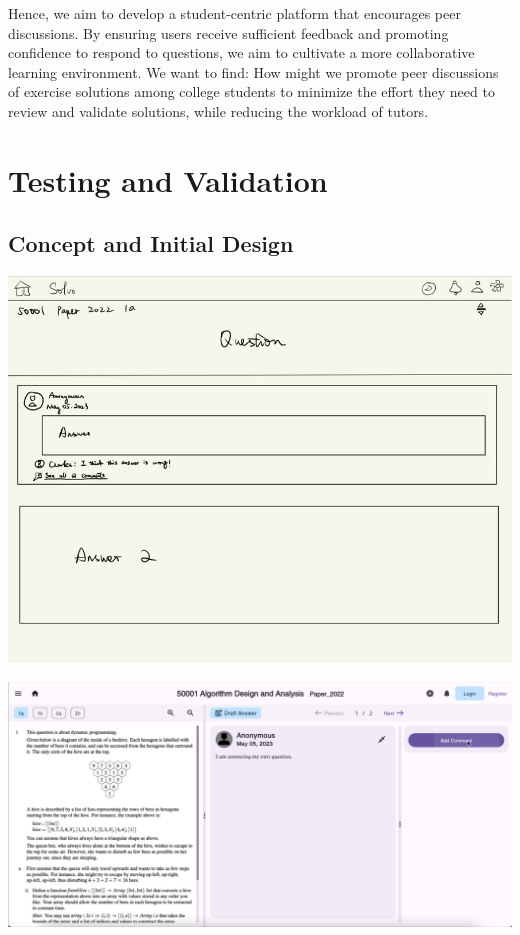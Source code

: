 \documentclass[a4paper]{article}
\begin{document}
    Hence, we aim to develop a student-centric platform that encourages peer discussions.
    By ensuring users receive sufficient feedback and promoting confidence to respond to questions, we aim to cultivate a more collaborative learning environment.
    We want to find: How might we promote peer discussions of exercise solutions among college students to minimize the effort they need to review and validate solutions,
    while reducing the workload of tutors.

    \section*{Testing and Validation}

    \subsection*{Concept and Initial Design}
    \noindent \begin{minipage}{0.4\textwidth}
                  \centering
                  \includegraphics[width=\textwidth]{concept2}
    \end{minipage}\hspace{0.05\textwidth}
    \begin{minipage}{0.57\textwidth}
        \centering
        \includegraphics[width=\textwidth]{question-page1}
    \end{minipage}
\end{document}
